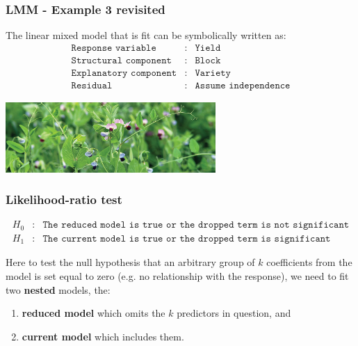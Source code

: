 \begin{frame}\frametitle{LMM - Example 3 revisited}
The linear mixed model that is fit can be symbolically written as:
\begin{eqnarray*}
	\texttt{Response variable}&:& \texttt{Yield} \\
	\texttt{Structural component}&:& \texttt{Block}\\
	\texttt{Explanatory component}&:& \texttt{Variety}\\
	\texttt{Residual}&:& \texttt{Assume independence}
\end{eqnarray*}

\vspace{1cm}
\centering
\includegraphics[width = 8cm]{fpeas}

\end{frame}


\begin{frame}\frametitle{Likelihood-ratio test}
\begin{eqnarray*}
	H_0&:& \texttt{The reduced model is true or the dropped term is not significant} \\
	H_1&:& \texttt{The current model is true or the dropped term is significant}
\end{eqnarray*}


Here to test the null hypothesis that an arbitrary group of $k$ coefficients from the model is set equal to zero (e.g.
no relationship with the response), we need to fit two \textbf{nested} models, the:


\begin{enumerate}
\item \textbf{reduced model} which omits the $k$ predictors in question, and
\item \textbf{current model} which includes them.
\end{enumerate}
\end{frame}


